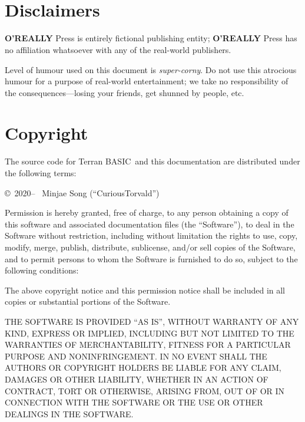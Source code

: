 \documentclass[10pt, stock, openany, chapter]{memoir}
\newcommand{\tbas}{Terran BASIC}
\newcommand{\oreallypress}{\begingroup\hspace{0.083em}\large\textbf{O'REALLY\raisebox{1ex}{\scriptsize ?}} \large Press\endgroup}
\begin{document}
{
\let\clearpage\relax
\chapter*{\ \\ Disclaimers}

\oreallypress{} is entirely fictional publishing entity; \oreallypress{} has no affiliation whatsoever with any of the real-world publishers.

Level of humour used on this document is \emph{super-corny}. Do not use this atrocious humour for a purpose of real-world entertainment; we take no responsibility of the consequences---losing your friends, get shunned by people, etc.
}

\chapter{Copyright}

The source code for \tbas\ and this documentation are distributed under the following terms:

\copyright\ 2020-- \ Minjae Song (``CuriousTorvald'')

Permission is hereby granted, free of charge, to any person obtaining a copy
of this software and associated documentation files (the ``Software''), to deal
in the Software without restriction, including without limitation the rights
to use, copy, modify, merge, publish, distribute, sublicense, and/or sell
copies of the Software, and to permit persons to whom the Software is
furnished to do so, subject to the following conditions:

The above copyright notice and this permission notice shall be included in all
copies or substantial portions of the Software.

THE SOFTWARE IS PROVIDED ``AS IS'', WITHOUT WARRANTY OF ANY KIND, EXPRESS OR
IMPLIED, INCLUDING BUT NOT LIMITED TO THE WARRANTIES OF MERCHANTABILITY,
FITNESS FOR A PARTICULAR PURPOSE AND NONINFRINGEMENT. IN NO EVENT SHALL THE
AUTHORS OR COPYRIGHT HOLDERS BE LIABLE FOR ANY CLAIM, DAMAGES OR OTHER
LIABILITY, WHETHER IN AN ACTION OF CONTRACT, TORT OR OTHERWISE, ARISING FROM,
OUT OF OR IN CONNECTION WITH THE SOFTWARE OR THE USE OR OTHER DEALINGS IN THE
SOFTWARE.

\printindex

\afterpage{\pagestyle{empty}\null\newpage}
\end{document}
